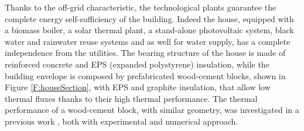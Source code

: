 Thanks to the off-grid characteristic, the technological plants guarantee the complete energy self-sufficiency of the building. Indeed the house, equipped with a biomass boiler, a solar thermal plant, a stand-alone photovoltaic system, black water and rainwater reuse systems and as well for water supply, has a complete independence from the utilities.   
The bearing structure of the house is made of reinforced concrete and EPS (expanded polystyrene) insulation, while the building envelope is composed by prefabricated wood-cement blocks, shown in Figure \ref{F:houseSection}, with EPS and graphite insulation, that allow low thermal fluxes thanks to their high thermal performance. The thermal performance of a wood-cement block, with similar geometry, was investigated in a previous work \cite{Nardi2016}, both with experimental and numerical approach.

